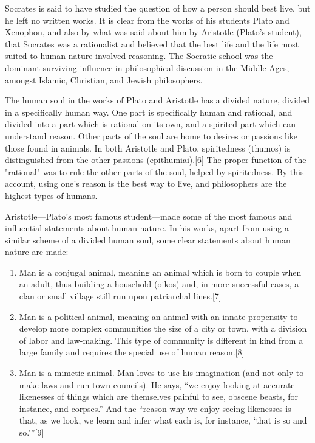 Socrates is said to have studied the question of how a person should best live, but he left no written works. It is clear from the works of his students Plato and Xenophon, and also by what was said about him by Aristotle (Plato's student), that Socrates was a rationalist and believed that the best life and the life most suited to human nature involved reasoning. The Socratic school was the dominant surviving influence in philosophical discussion in the Middle Ages, amongst Islamic, Christian, and Jewish philosophers.

The human soul in the works of Plato and Aristotle has a divided nature, divided in a specifically human way. One part is specifically human and rational, and divided into a part which is rational on its own, and a spirited part which can understand reason. Other parts of the soul are home to desires or passions like those found in animals. In both Aristotle and Plato, spiritedness (thumos) is distinguished from the other passions (epithumiai).[6] The proper function of the "rational" was to rule the other parts of the soul, helped by spiritedness. By this account, using one's reason is the best way to live, and philosophers are the highest types of humans.

Aristotle—Plato's most famous student—made some of the most famous and influential statements about human nature. In his works, apart from using a similar scheme of a divided human soul, some clear statements about human nature are made:

\begin{enumerate}
\item Man is a conjugal animal, meaning an animal which is born to couple when an adult, thus building a household (oikos) and, in more successful cases, a clan or small village still run upon patriarchal lines.[7]
\item Man is a political animal, meaning an animal with an innate propensity to develop more complex communities the size of a city or town, with a division of labor and law-making. This type of community is different in kind from a large family and requires the special use of human reason.[8]
\item Man is a mimetic animal. Man loves to use his imagination (and not only to make laws and run town councils). He says, ``we enjoy looking at accurate likenesses of things which are themselves painful to see, obscene beasts, for instance, and corpses.'' And the ``reason why we enjoy seeing likenesses is that, as we look, we learn and infer what each is, for instance, `that is so and so.'''[9]
\end{enumerate}

